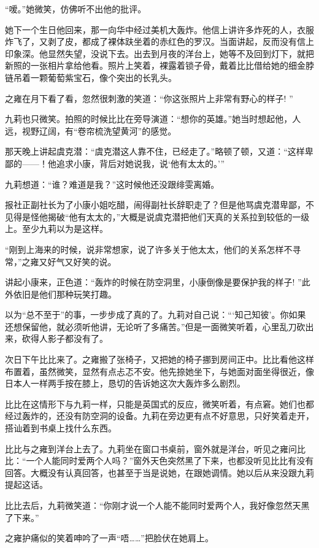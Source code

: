 \par “嗳。”她微笑，仿佛听不出他的批评。
\par 她下一个生日他回来，那一向华中经过美机大轰炸。他信上讲许多炸死的人，衣服炸飞了，又剥了皮，都成了裸体趺坐着的赤红色的罗汉。当面讲起，反而没有信上印象深。他显然失望，没说下去。出去到月夜的洋台上，她等不及回到灯下，就把新照的一张相片拿给他看。照片上笑着，裸露着锁子骨，戴着比比借给她的细金脖链吊着一颗葡萄紫宝石，像个突出的长乳头。
\par 之雍在月下看了看，忽然很刺激的笑道：“你这张照片上非常有野心的样子! ”
\par 九莉也只微笑。拍照的时候比比在旁导演道：“想你的英雄。”她当时想起他，人远，视野辽阔，有“卷帘梳洗望黄河”的感觉。
\par 那天晚上讲起虞克潜：“虞克潜这人靠不住，已经走了。”略顿了顿，又道：“这样卑鄙的——！他追求小康，背后对她说我，说‘他有太太的。'”
\par 九莉想道：“谁？难道是我？”这时候他还没跟绯雯离婚。
\par 报社正副社长为了小康小姐吃醋，闹得副社长辞职走了？但是他骂虞克潜卑鄙，不见得是怪他揭破“他有太太的，”大概是说虞克潜把他们天真的关系拉到较低的一级上。至少九莉以为是这样。
\par “刚到上海来的时候，说非常想家，说了许多关于他太太，他们的关系怎样不寻常，”之雍又好气又好笑的说。
\par 讲起小康来，正色道：“轰炸的时候在防空洞里，小康倒像是要保护我的样子! ”此外依旧是他们那种玩笑打趣。
\par 以为“总不至于”的事，一步步成了真的了。九莉对自己说：“‘知己知彼’。你如果还想保留他，就必须听他讲，无论听了多痛苦。”但是一面微笑听着，心里乱刀砍出来，砍得人影子都没有了。
\par 次日下午比比来了。之雍搬了张椅子，又把她的椅子挪到房间正中。比比看他这样布置着，虽然微笑，显然有点忐忑不安。他先捺她坐下，与她面对面坐得很近，像日本人一样两手按在膝上，恳切的告诉她这次大轰炸多么剧烈。
\par 比比在这情形下与九莉一样，只能是英国式的反应，微笑听着，有点窘。她们也都经过轰炸的，还没有防空洞的设备。九莉在旁边更有点不好意思，只好笑着走开，搭讪着到书桌上找什么东西。
\par 比比与之雍到洋台上去了。九莉坐在窗口书桌前，窗外就是洋台，听见之雍问比比：“一个人能同时爱两个人吗？”窗外天色突然黑了下来，也都没听见比比有没有回答。大概没有认真回答，也甚至于当是说她，在跟她调情。她以后从来没跟九莉提起这话。
\par 比比去后，九莉微笑道：“你刚才说一个人能不能同时爱两个人，我好像忽然天黑了下来。”
\par 之雍护痛似的笑着呻吟了一声“唔……”把脸伏在她肩上。
